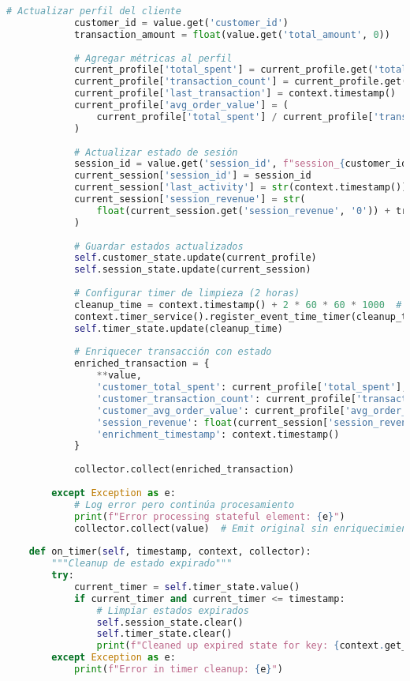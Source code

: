 \begin{lstlisting}[language=python, caption=Configuración Optimizada de Estado y Checkpointing, label=lst:flink_checkpointing]
            # Actualizar perfil del cliente
            customer_id = value.get('customer_id')
            transaction_amount = float(value.get('total_amount', 0))
            
            # Agregar métricas al perfil
            current_profile['total_spent'] = current_profile.get('total_spent', 0) + transaction_amount
            current_profile['transaction_count'] = current_profile.get('transaction_count', 0) + 1
            current_profile['last_transaction'] = context.timestamp()
            current_profile['avg_order_value'] = (
                current_profile['total_spent'] / current_profile['transaction_count']
            )
            
            # Actualizar estado de sesión
            session_id = value.get('session_id', f"session_{customer_id}_{context.timestamp()}")
            current_session['session_id'] = session_id
            current_session['last_activity'] = str(context.timestamp())
            current_session['session_revenue'] = str(
                float(current_session.get('session_revenue', '0')) + transaction_amount
            )
            
            # Guardar estados actualizados
            self.customer_state.update(current_profile)
            self.session_state.update(current_session)
            
            # Configurar timer de limpieza (2 horas)
            cleanup_time = context.timestamp() + 2 * 60 * 60 * 1000  # 2 horas en ms
            context.timer_service().register_event_time_timer(cleanup_time)
            self.timer_state.update(cleanup_time)
            
            # Enriquecer transacción con estado
            enriched_transaction = {
                **value,
                'customer_total_spent': current_profile['total_spent'],
                'customer_transaction_count': current_profile['transaction_count'],
                'customer_avg_order_value': current_profile['avg_order_value'],
                'session_revenue': float(current_session['session_revenue']),
                'enrichment_timestamp': context.timestamp()
            }
            
            collector.collect(enriched_transaction)
            
        except Exception as e:
            # Log error pero continúa procesamiento
            print(f"Error processing stateful element: {e}")
            collector.collect(value)  # Emit original sin enriquecimiento
    
    def on_timer(self, timestamp, context, collector):
        """Cleanup de estado expirado"""
        try:
            current_timer = self.timer_state.value()
            if current_timer and current_timer <= timestamp:
                # Limpiar estados expirados
                self.session_state.clear()
                self.timer_state.clear()
                print(f"Cleaned up expired state for key: {context.get_current_key()}")
        except Exception as e:
            print(f"Error in timer cleanup: {e}")
\end{lstlisting}

